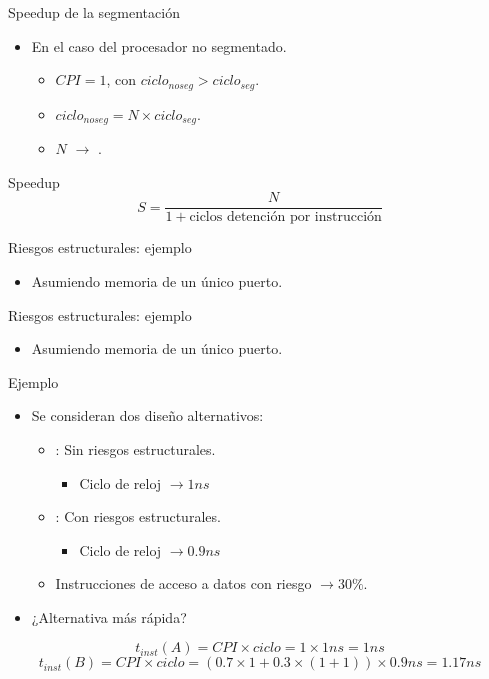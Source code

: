 \begin{frame}[t]{Speedup de la segmentación}
\begin{itemize}
  \item En el caso del procesador no segmentado.
    \begin{itemize}
      \item $CPI=1$, con $ciclo_{noseg} > ciclo_{seg}$.
      \item $ciclo_{noseg} = N \times ciclo_{seg}$.
      \item $N$ $\rightarrow$ .
    \end{itemize}
\end{itemize}
\begin{block}{Speedup}
\[
S =
\frac{N}{1 + \text{ciclos detención por instrucción}}
\]
\end{block}
\end{frame}

\begin{frame}[t]{Riesgos estructurales: ejemplo}
\makebox[\textwidth][c]{

}
\begin{itemize}
  \item Asumiendo memoria de un único puerto.
\end{itemize}
\end{frame}

\begin{frame}[t]{Riesgos estructurales: ejemplo}
\makebox[\textwidth][c]{

}
\begin{itemize}
  \item Asumiendo memoria de un único puerto.
\end{itemize}
\end{frame}

\begin{frame}[t]{Ejemplo}
\begin{itemize}
  \item Se consideran dos diseño alternativos:
    \begin{itemize}
      \item {}: Sin riesgos estructurales.
        \begin{itemize}
          \item Ciclo de reloj $\rightarrow 1 ns$
        \end{itemize}
      \item {}: Con riesgos estructurales.
        \begin{itemize}
          \item Ciclo de reloj $\rightarrow 0.9 ns$
        \end{itemize}
      \item Instrucciones de acceso a datos con riesgo $\rightarrow 30\%$.
    \end{itemize}
  
  \item ¿Alternativa más rápida?
\end{itemize}
\[
t_{inst}(A) =
CPI \times ciclo = 1 \times 1 ns = 1 ns
\]
\[
t_{inst}(B) =
CPI \times ciclo = (0.7 \times 1 + 0.3 \times (1 + 1)) \times 0.9 ns =
1.17 ns
\]
\end{frame}
